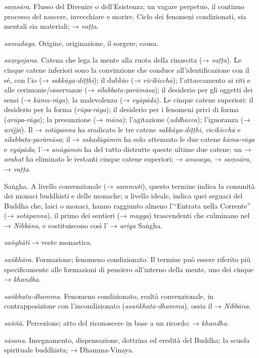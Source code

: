 \emph{saṃsāra}. Flusso del Divenire o dell'Esistenza; un vagare
perpetuo, il continuo processo del nascere, invecchiare e morire. Ciclo
dei fenomeni condizionati, sia mentali sia materiali; → \emph{vaṭṭa}.

\emph{samudaya}. Origine, originazione, il sorgere; causa.

\emph{saṃyojana}. Catena che lega la mente alla ruota della rinascita (→
\emph{vaṭṭa}). Le cinque catene inferiori sono la convinzione che
conduce all'identificazione con il sé, con l'io (→
\emph{sakkāya-diṭṭhi}); il dubbio (→ \emph{vicikicchā}); l'attaccamento
ai riti e alle cerimonie/osservanze (→ \emph{sīlabbata-parāmāsa}); il
desiderio per gli oggetti dei sensi (→ \emph{kāma-rāga}); la malevolenza
(→ \emph{vyāpāda}). Le cinque catene superiori: il desiderio per la
forma (\emph{rūpa}-\emph{rāga}); il desiderio per i fenomeni privi di
forma (\emph{arūpa}-\emph{rāga}); la presunzione (→ \emph{māna});
l'agitazione (\emph{uddhacca}); l'ignoranza (→ \emph{avijjā}). Il →
\emph{sotāpanna} ha sradicato le tre catene \emph{sakkāya-diṭṭhi},
\emph{vicikicchā} e \emph{sīlabbata-parāmāsa}; il → \emph{sakadāgāmin}
ha solo attenuato le due catene \emph{kāma-rāga} e \emph{vyāpāda}; l'→
\emph{anāgāmin} ha del tutto distrutte queste ultime due catene; un →
\emph{arahat} ha eliminato le restanti cinque catene superiori; →
\emph{anusaya}, → \emph{saṃsāra}, → \emph{vaṭṭa}.

Saṅgha. A livello convenzionale (→ \emph{sammuti}), questo termine
indica la comunità dei monaci buddhisti e delle monache; a livello
ideale, indica quei seguaci del Buddha che, laici o monaci, hanno
raggiunto almeno l'``Entrata nella Corrente'' (→ \emph{sotāpanna}), il
primo dei sentieri (→ \emph{magga}) trascendenti che culminano nel →
\emph{Nibbāna}, e costituiscono così l' → \emph{ariya} Saṅgha\emph{.}

\emph{saṅghāti} → veste monastica.

\emph{saṅkhāra}. Formazione; fenomeno condizionato. Il termine può
essere riferito più specificamente alle formazioni di pensiero
all'interno della mente, uno dei cinque → \emph{khandha}.

\emph{saṅkhata-dhamma}. Fenomeno condizionato, realtà convenzionale, in
contrapposizione con l'incondizionato (\emph{asaṅkhata-dhamma}), ossia
il → \emph{Nibbāna}.

\emph{saññā}. Percezione; atto del riconoscere in base a un ricordo; →
\emph{khandha}.

\emph{sāsana}. Insegnamento, dispensazione, dottrina ed eredità del
Buddha; la scuola spirituale buddhista; → Dhamma-Vinaya.

